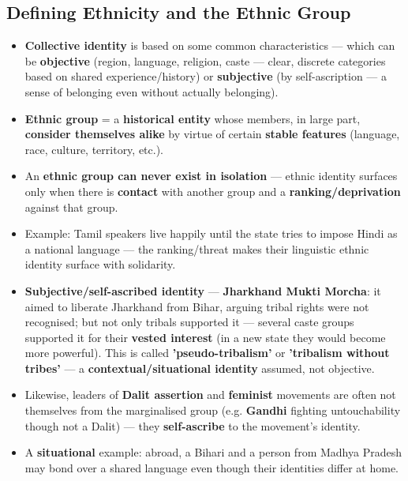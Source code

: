 \subsection{Defining Ethnicity and the Ethnic Group}

\begin{KeyConcept}
\begin{itemize}
\item \textbf{Collective identity} is based on some common characteristics --- which can be \textbf{objective} (region, language, religion, caste --- clear, discrete categories based on shared experience/history) or \textbf{subjective} (by self-ascription --- a sense of belonging even without actually belonging).
\item \textbf{Ethnic group} = a \textbf{historical entity} whose members, in large part, \textbf{consider themselves alike} by virtue of certain \textbf{stable features} (language, race, culture, territory, etc.).
\item An \textbf{ethnic group can never exist in isolation} --- ethnic identity surfaces only when there is \textbf{contact} with another group and a \textbf{ranking/deprivation} against that group.
\item Example: Tamil speakers live happily until the state tries to impose Hindi as a national language --- the ranking/threat makes their linguistic ethnic identity surface with solidarity.
\end{itemize}
\end{KeyConcept}

\begin{ExampleBox}
\begin{itemize}
\item \textbf{Subjective/self-ascribed identity} --- \textbf{Jharkhand Mukti Morcha}: it aimed to liberate Jharkhand from Bihar, arguing tribal rights were not recognised; but not only tribals supported it --- several caste groups supported it for their \textbf{vested interest} (in a new state they would become more powerful). This is called \textbf{'pseudo-tribalism'} or \textbf{'tribalism without tribes'} --- a \textbf{contextual/situational identity} assumed, not objective.
\item Likewise, leaders of \textbf{Dalit assertion} and \textbf{feminist} movements are often not themselves from the marginalised group (e.g. \textbf{Gandhi} fighting untouchability though not a Dalit) --- they \textbf{self-ascribe} to the movement's identity.
\item A \textbf{situational} example: abroad, a Bihari and a person from Madhya Pradesh may bond over a shared language even though their identities differ at home.
\end{itemize}
\end{ExampleBox}

